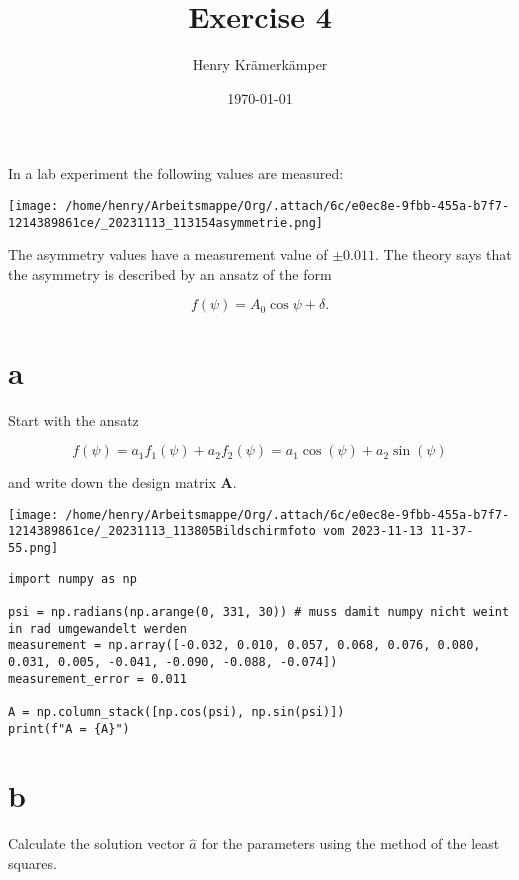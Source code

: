 \documentclass[11pt]{article}
\author{Henry Krämerkämper}
\date{\today}
\title{Exercise 4}
\begin{document}
\maketitle
In a lab experiment the following values are measured:

\begin{center}
\texttt{[image: /home/henry/Arbeitsmappe/Org/.attach/6c/e0ec8e-9fbb-455a-b7f7-1214389861ce/\_20231113\_113154asymmetrie.png]}
\end{center}


The asymmetry values have a measurement value of \(\pm0.011\). The theory says that the
asymmetry is described by an ansatz of the form

\begin{equation*}
   f(\psi) = A_{0} \cos{\psi + \delta}.
\end{equation*}
\section{a}
\label{sec:orgd39a7c6}
Start with the ansatz

\begin{equation*}
   f(\psi) = a_{1} f_{1}(\psi) + a_{2} f_{2} (\psi) = a_{1} \cos(\psi) + a_{2} \sin{(\psi)}
\end{equation*}

and write down the design matrix \textbf{A}.

\begin{center}
\texttt{[image: /home/henry/Arbeitsmappe/Org/.attach/6c/e0ec8e-9fbb-455a-b7f7-1214389861ce/\_20231113\_113805Bildschirmfoto vom 2023-11-13 11-37-55.png]}
\end{center}

\begin{verbatim}
import numpy as np

psi = np.radians(np.arange(0, 331, 30)) # muss damit numpy nicht weint in rad umgewandelt werden
measurement = np.array([-0.032, 0.010, 0.057, 0.068, 0.076, 0.080, 0.031, 0.005, -0.041, -0.090, -0.088, -0.074])
measurement_error = 0.011

A = np.column_stack([np.cos(psi), np.sin(psi)])
print(f"A = {A}")
\end{verbatim}
\section{b}
\label{sec:orgf34e2f3}

Calculate the solution vector \(\hat{a}\) for the parameters using the method of the least squares.
\end{document}
